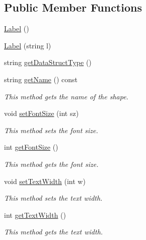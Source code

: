 \subsection*{Public Member Functions}
\begin{DoxyCompactItemize}
\item 
\hyperlink{classbridges_1_1datastructure_1_1_label_abd73b3f555e6de007b7cb82cdf7c57cd}{Label} ()
\item 
\hyperlink{classbridges_1_1datastructure_1_1_label_a2eacf0820ea29c309f4910db5756607c}{Label} (string l)
\item 
string \hyperlink{classbridges_1_1datastructure_1_1_label_a55ccc4e52bd1f09c55ba6b775e7768ab}{get\+Data\+Struct\+Type} ()
\item 
string \hyperlink{classbridges_1_1datastructure_1_1_label_ac2a15e34404b9b7859e658da63a7020f}{get\+Name} () const
\begin{DoxyCompactList}\small\item\em This method gets the name of the shape. \end{DoxyCompactList}\item 
void \hyperlink{classbridges_1_1datastructure_1_1_label_aee5cc86a51a237c87e56db8e02d271b1}{set\+Font\+Size} (int sz)
\begin{DoxyCompactList}\small\item\em This method sets the font size. \end{DoxyCompactList}\item 
int \hyperlink{classbridges_1_1datastructure_1_1_label_a200cc9710f28af2e63738d5166eaa51f}{get\+Font\+Size} ()
\begin{DoxyCompactList}\small\item\em This method gets the font size. \end{DoxyCompactList}\item 
void \hyperlink{classbridges_1_1datastructure_1_1_label_a323af06f4536c644d6cc265b332b6ad0}{set\+Text\+Width} (int w)
\begin{DoxyCompactList}\small\item\em This method sets the text width. \end{DoxyCompactList}\item 
int \hyperlink{classbridges_1_1datastructure_1_1_label_ab97fecf82c0c21f870f4dc25b6244099}{get\+Text\+Width} ()
\begin{DoxyCompactList}\small\item\em This method gets the text width. \end{DoxyCompactList}\item 

\end{DoxyCompactItemize}
